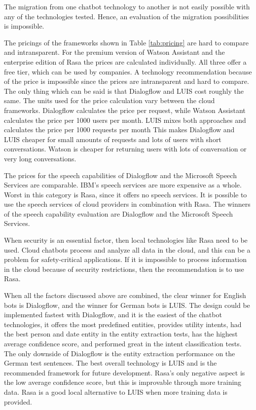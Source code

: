 The migration from one chatbot technology to another is not easily possible with any of the technologies tested. 
Hence, an evaluation of the migration possibilities is impossible.

The pricings of the frameworks shown in Table \ref{tab:pricing} are hard to compare and intransparent.
For the premium version of Watson Assistant and the enterprise edition of Rasa the prices are calculated individually.
All three offer a free tier, which can be used by companies.
A technology recommendation because of the price is impossible since the prices are intransparent and hard to compare.
The only thing which can be said is that Dialogflow and LUIS cost roughly the same.
The units used for the price calculation vary between the cloud frameworks.
Dialogflow calculates the price per request, while Watson Assistant calculates the price per 1000 users per month.
LUIS mixes both approaches and calculates the price per 1000 requests per month
This makes Dialogflow and LUIS cheaper for small amounts of requests and lots of users with short conversations.
Watson is cheaper for returning users with lots of conversation or very long conversations.

The prices for the speech capabilities of Dialogflow and the Microsoft Speech Services are comparable.
IBM's speech services are more expensive as a whole.
Worst in this category is Rasa, since it offers no speech services.
It is possible to use the speech services of cloud providers in combination with Rasa.
The winners of the speech capability evaluation are Dialogflow and the Microsoft Speech Services.

When security is an essential factor, then local technologies like Rasa need to be used.
Cloud chatbots process and analyze all data in the cloud, and this can be a problem for safety-critical applications.
If it is impossible to process information in the cloud because of security restrictions, then the recommendation is to use Rasa.

When all the factors discussed above are combined, the clear winner for English bots is Dialogflow, and the winner for German bots is LUIS.
The design could be implemented fastest with Dialogflow, and it is the easiest of the chatbot technologies,
it offers the most predefined entities, provides utility intents, had the best person and date entity in the entity extraction tests, has the highest average confidence score, and performed great in the intent classification tests.
The only downside of Dialogflow is the entity extraction performance on the German test sentences.
The best overall technology is LUIS and is the recommended framework for future development.
Rasa's only negative aspect is the low average confidence score, but this is improvable through more training data.
Rasa is a good local alternative to LUIS when more training data is provided.

